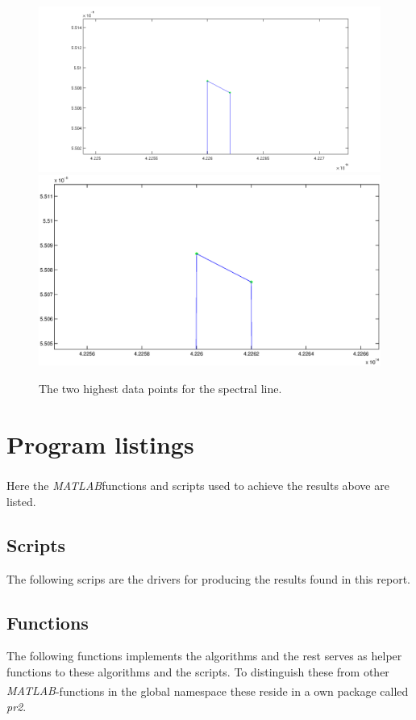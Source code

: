 \documentclass[10pt, a4paper]{article}
\newcommand{\matlab}{\small{\emph{MATLAB\textsuperscript{\textregistered}}}}
\begin{document}
\begin{figure}[hbt]
\begin{center}
\ifpdf
	\includegraphics[width=\linewidth]{../img/peak6.png}
\else
	\includegraphics[width=\linewidth]{../img/peak6.eps}
\fi
\end{center}
\caption{The two highest data points for the spectral line.}
\label{fig:peak6}
\end{figure}



\clearpage

\section{Program listings} \label{appendix:programs}
Here the \matlab functions and scripts used to achieve the results above are listed.

\subsection{Scripts}
The following scrips are the drivers for producing the results found in this report.



\subsection{Functions}
The following functions implements the algorithms and the rest serves as helper functions to these algorithms and the scripts. To distinguish these from other \matlab-functions in the global namespace these reside in a own package called \emph{pr2}.


\end{document}
